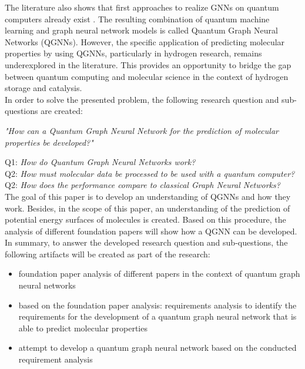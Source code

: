 The literature also shows that first approaches to realize GNNs on quantum computers already exist \cite{verdon_quantum_2019, beer_quantum_2021,ai_decompositional_2023,zheng2021quantum,ryu2023quantum}. The resulting combination of quantum machine learning and graph neural network models is called Quantum Graph Neural Networks (QGNNs). However, the specific application of predicting molecular properties by using QGNNs, particularly in hydrogen research, remains underexplored in the literature. This provides an opportunity to bridge the gap between quantum computing and molecular science in the context of hydrogen storage and catalysis. \\
    
In order to solve the presented problem, the following research question and sub-questions are created: 

\begin{center}
    \textit{"How can a Quantum Graph Neural Network for the prediction of molecular properties be developed?"} \\
\end{center}
Q1: \textit{How do Quantum Graph Neural Networks work?} \\
Q2: \textit{How must molecular data be processed to be used with a quantum computer?} \\
Q2: \textit{How does the performance compare to classical Graph Neural Networks?} \\

The goal of this paper is to develop an understanding of QGNNs and how they work. Besides, in the scope of this paper, an understanding of the prediction of potential energy surfaces of molecules is created. Based on this procedure, the analysis of different foundation papers will show how a QGNN can be developed. In summary, to answer the developed research question and sub-questions, the following artifacts will be created as part of the research: 

\begin{itemize}
    \item foundation paper analysis of different papers in the context of quantum graph neural networks
    \item based on the foundation paper analysis: requirements analysis to identify the requirements for the development of a quantum graph neural network that is able to predict molecular properties 
    \item attempt to develop a quantum graph neural network based on the conducted requirement analysis
\end{itemize}  

